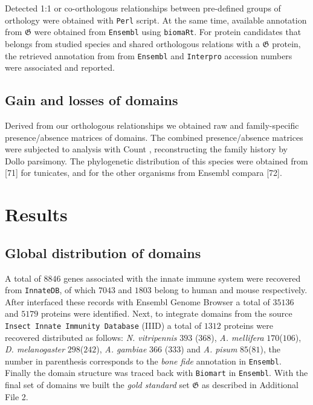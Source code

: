 \documentclass[11pt]{article}
\newcommand{\TODO}[1]{\begingroup\color{red}#1\endgroup}
\begin{document}
Detected 1:1 or co-orthologous relationships between pre-defined groups of 
orthology were obtained with \texttt{Perl} script. At the same time, available 
annotation from $\boldsymbol{\mathfrak{G}}$ were obtained from \texttt{Ensembl} 
using \texttt{biomaRt}. For protein candidates that belongs from studied 
species and shared orthologous relations with a $\boldsymbol{\mathfrak{G}}$ 
protein, the retrieved annotation from from \texttt{Ensembl} and 
\texttt{Interpro} accession numbers were associated and reported.


\TODO{
\subsection*{Gain and losses of domains}

Derived from our orthologous relationships we obtained raw and family-specific 
presence/absence matrices of domains. The combined presence/absence matrices 
were subjected to analysis with Count \cite{csuros2010}, reconstructing the 
family history by Dollo parsimony. The phylogenetic distribution of this species 
were obtained from [71] for tunicates, and for the other organisms from Ensembl 
compara [72].
}
\section*{Results}

\subsection*{Global distribution of domains}

A total of $8846$ genes associated with the innate immune system were recovered 
from \texttt{InnateDB}, of which $7043$ and $1803$ belong to human and mouse 
respectively. After interfaced these records with Ensembl Genome Browser a total 
of $35136$ and $5179$ proteins were identified. Next, to integrate domains 
from the source \texttt{Insect Innate Immunity Database} (IIID) a total of 
$1312$ proteins were recovered distributed as follows: \textsl{N. vitripennis} 
$393$ ($368$), \textsl{A. mellifera} $170$($106$), \textsl{D. melanogaster} 
$298$($242$), \textsl{A. gambiae} $366$ ($333$) and \textsl{A. pisum} 
$85$($81$), the number in parenthesis corresponds to the \textsl{bone fide} 
annotation in \texttt{Ensembl}. Finally the domain structure was traced back 
with \texttt{Biomart} in \texttt{Ensembl}. With the final set of domains we 
built the \textsl{gold standard} set $\boldsymbol{\mathfrak{G}}$ as described 
in Additional File 2. 
\end{document}
